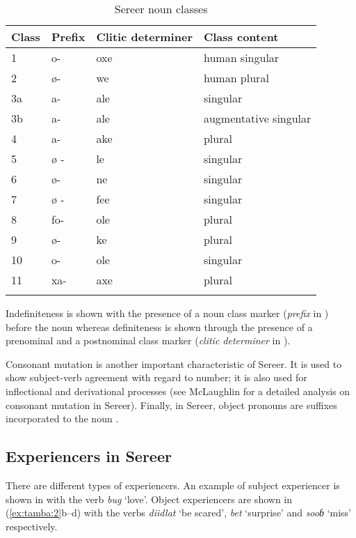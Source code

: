 \documentclass[output=paper]{langscibook}
\begin{document}
\begin{table}
\caption{\label{tab:tamba:1}Sereer noun classes}

\begin{tabular}{llll}
\lsptoprule 
Class & Prefix & Clitic determiner & Class content\\\midrule
1 & o- & oxe & human singular\\
2 & ø{}- & we & human plural\\
3a & a- & ale & singular\\
3b & a- & ale & augmentative singular\\
4 & a- & ake & plural\\
5 & ø - & le & singular\\
6 & ø- & ne & singular\\
7 & ø - & fee & singular\\
8 & fo- & ole & plural\\
9 & ø- & ke & plural\\
10 & o- & ole & singular\\
11 & xa- & axe & plural\\
\lspbottomrule
\end{tabular}
\end{table}


  Indefiniteness is shown with the presence of a noun class marker (\textit{prefix} in ) before the noun whereas definiteness is shown through the presence of a prenominal and a postnominal class marker (\textit{clitic determiner} in ). 

  Consonant mutation is another important characteristic of Sereer. It is used to show subject-verb  agreement with regard to number; it is also used for inflectional and derivational processes (see McLaughlin for a detailed analysis on consonant mutation in Sereer). Finally, in Sereer, object pronouns are suffixes incorporated to the noun \citep{BaierTA}.

\subsection{Experiencers in Sereer}

There are different types of experiencers. An example of subject experiencer is shown in  with the verb \textit{bug} `love'. Object experiencers are shown in (\ref{ex:tamba:2}b--d) with the verbs \textit{diidlat} `be scared', \textit{bet} `surprise' and \textit{sooɓ}  ‘miss’ respectively.
\end{document}
